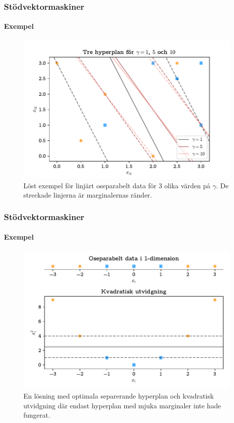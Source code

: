 \documentclass{beamer}
\theoremstyle{definition}
\theoremstyle{remark}
\begin{document}
\begin{frame}
\frametitle{Stödvektormaskiner}
\framesubtitle{Exempel}
\begin{figure}[h]
	\centering
	\includegraphics[width=0.8\linewidth, trim={0.5cm 2mm 0.5cm 6mm}, clip]{KandFigur2.pdf}
	\caption{\label{fig:mjukamarginaler}Löst exempel för linjärt oseparabelt data för 3 olika värden på $\gamma$. De streckade linjerna är marginalernas ränder.}
\end{figure}
\end{frame}

\begin{frame}
\frametitle{Stödvektormaskiner}
\framesubtitle{Exempel}
\begin{figure}[h]
	\centering
	\includegraphics[width=0.8\linewidth, trim={0.5cm 4mm -5mm 4mm}, clip]{KandFigur3.pdf}
	\caption{\label{fig:kvadratisk}En lösning med optimala separerande hyperplan och kvadratisk utvidgning där endast hyperplan med mjuka marginaler inte hade fungerat.}
\end{figure}
\end{frame}
\end{document}

